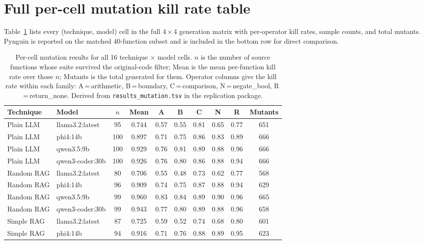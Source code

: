\documentclass[smallextended]{svjour3}
\begin{document}
\section{Full per-cell mutation kill rate table}\label{app:percell}

Table~\ref{tab:percell-app} lists every (technique, model) cell in
the full 4\,$\times$\,4 generation matrix with per-operator kill
rates, sample counts, and total mutants. Pynguin is reported on
the matched 40-function subset and is included in the bottom
row for direct comparison. 

\begin{table}[htbp]
\centering
\caption{Per-cell mutation results for all 16 technique $\times$ model
cells. $n$ is the number of source functions whose suite survived the
original-code filter; Mean is the mean per-function kill rate over
those $n$; Mutants is the total generated for them. Operator columns
give the kill rate within each family:
A\,=\,arithmetic, B\,=\,boundary, C\,=\,comparison,
N\,=\,negate\_bool, R\,=\,return\_none. Derived from
\texttt{results\_mutation.tsv} in the replication package.}
\label{tab:percell-app}
\footnotesize
\setlength{\tabcolsep}{3pt}
\begin{tabular}{@{}llcccccccc@{}}
\toprule
Technique & Model & $n$ & Mean & A & B & C & N & R & Mutants \\
\midrule
Plain LLM & llama3.2:latest & 95 & 0.744 & 0.57 & 0.55 & 0.81 & 0.65 & 0.77 & 651 \\
Plain LLM & phi4:14b & 100 & 0.897 & 0.71 & 0.75 & 0.86 & 0.83 & 0.89 & 666 \\
Plain LLM & qwen3.5:9b & 100 & 0.929 & 0.76 & 0.81 & 0.89 & 0.88 & 0.96 & 666 \\
Plain LLM & qwen3-coder:30b & 100 & 0.926 & 0.76 & 0.80 & 0.86 & 0.88 & 0.94 & 666 \\
\midrule
Random RAG & llama3.2:latest & 80 & 0.706 & 0.55 & 0.48 & 0.73 & 0.62 & 0.77 & 568 \\
Random RAG & phi4:14b & 96 & 0.909 & 0.74 & 0.75 & 0.87 & 0.88 & 0.94 & 629 \\
Random RAG & qwen3.5:9b & 99 & 0.960 & 0.83 & 0.84 & 0.89 & 0.90 & 0.96 & 665 \\
Random RAG & qwen3-coder:30b & 99 & 0.943 & 0.77 & 0.80 & 0.89 & 0.88 & 0.96 & 658 \\
\midrule
Simple RAG & llama3.2:latest & 87 & 0.725 & 0.59 & 0.52 & 0.74 & 0.68 & 0.80 & 601 \\
Simple RAG & phi4:14b & 94 & 0.916 & 0.71 & 0.76 & 0.88 & 0.89 & 0.95 & 623 \\

\end{tabular}
\end{table}
\end{document}

